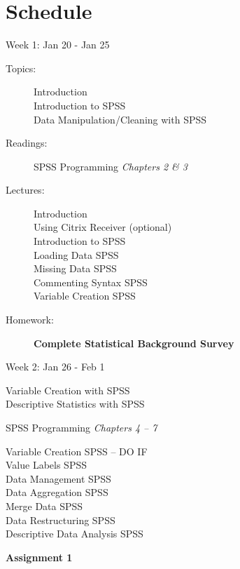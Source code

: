 \documentclass[11pt,article,oneside]{memoir}
\newcounter{schedule}
\begin{document}
\vspace{.25in}

\section*{Schedule}
\begin{schedule}{Week 1: Jan 20 - Jan 25}
\begin{description}
\item[Topics:] Introduction \\ Introduction to SPSS \\ Data Manipulation/Cleaning with SPSS
\item[Readings:] SPSS Programming \textit{Chapters 2 \& 3}

\item[Lectures:] Introduction \\ Using Citrix Receiver (optional) \\ Introduction to SPSS \\ Loading Data SPSS \\ Missing Data SPSS \\ Commenting Syntax SPSS \\ Variable Creation SPSS

\item[Homework:] \textbf{Complete Statistical Background Survey} 

\end{description}
\end{schedule}
\begin{schedule}{Week 2: Jan 26 - Feb 1}
\begin{description}[style=nextline, noitemsep]
\item[Topics:] Variable Creation with SPSS \\  Descriptive Statistics with SPSS

\item[Readings:] SPSS Programming \textit{Chapters 4 -- 7}

\item[Lectures:] Variable Creation SPSS -- DO IF \\ Value Labels SPSS \\ Data Management SPSS \\  Data Aggregation SPSS \\  Merge Data SPSS \\ Data Restructuring SPSS \\ Descriptive Data Analysis SPSS
  

\item[Homework:] \textbf{Assignment 1}

\end{description}
\end{schedule}
\end{document}
